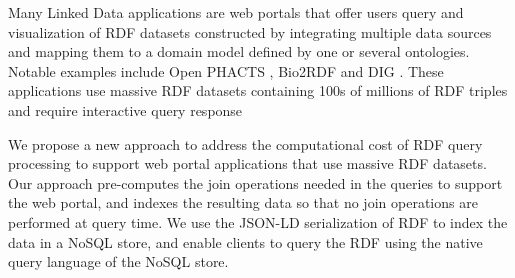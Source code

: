 Many Linked Data applications are web portals that offer users query and visualization of RDF datasets constructed by integrating multiple data sources and mapping them to a domain model defined by one or several ontologies.
Notable examples include Open PHACTS \cite{Groth_Loizou_Gray_Goble_Harland_Pettifer_2014}, Bio2RDF \cite{callahan2013bio2rdf} and DIG \cite{szekely2015building}.
These applications use massive RDF datasets containing 100s of millions of RDF triples and require interactive query response

We propose a new approach to address the computational cost of RDF query processing to support web portal applications that use massive RDF datasets.
Our approach pre-computes the join operations needed in the queries to support the web portal, and indexes the resulting data so that no join operations are performed at query time.
We use the JSON-LD serialization of RDF to index the data in a NoSQL store, and enable clients to query the RDF using the native query language of the NoSQL store.

